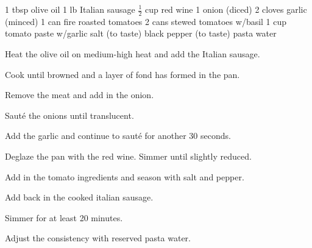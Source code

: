 \dishtype{\sauce}
\dishother{}
\begin{ingreds}
    1 tbsp olive oil
    1 lb Italian sausage
    $\frac{1}{2}$ cup red wine
    1 onion (diced)
    2 cloves garlic (minced)
    1 can fire roasted tomatoes
    2 cans stewed tomatoes w/basil
    1 cup tomato paste w/garlic
    salt (to taste)
    black pepper (to taste)
    pasta water
\end{ingreds}
\begin{method}
    Heat the olive oil on medium-high heat and add the Italian sausage.\par
    Cook until browned and a layer of fond has formed in the pan.\par
    Remove the meat and add in the onion.\par
    Saut\'e the onions until translucent.\par
    Add the garlic and continue to saut\'e for another 30 seconds.\par
    Deglaze the pan with the red wine. Simmer until slightly reduced.\par
    Add in the tomato ingredients and season with salt and pepper.\par
    Add back in the cooked italian sausage.\par
    Simmer for at least 20 minutes.\par
    Adjust the consistency with reserved pasta water.
\end{method}